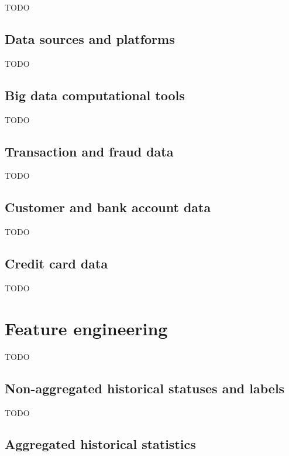 \documentclass[12pt, a4paper]{report}
\theoremstyle{plain}
\theoremstyle{plain}
\theoremstyle{remark}
\begin{document}
TODO

\subsection{Data sources and platforms}
\label{subsec:ccfm_dw_data_sources_and_platforms}

TODO

\subsection{Big data computational tools}
\label{subsec:ccfm_dw_big_data_computational_tools}

TODO

\subsection{Transaction and fraud data}
\label{subsec:ccfm_dw_transaction_and_fraud_data}

TODO

\subsection{Customer and bank account data}
\label{subsec:ccfm_dw_customer_data}

TODO

\subsection{Credit card data}
\label{subsec:ccfm_dw_credit_card_data}

TODO

\section{Feature engineering}
\label{sec:ccfm_feature_engineering}

TODO

\subsection{Non-aggregated historical statuses and labels}
\label{subsec:ccfm_fe_non_aggregated_historical_statuses_and_labels}

TODO

\subsection{Aggregated historical statistics}
\label{subsec:ccfm_fe_aggregated_historical_statistics}
\end{document}
